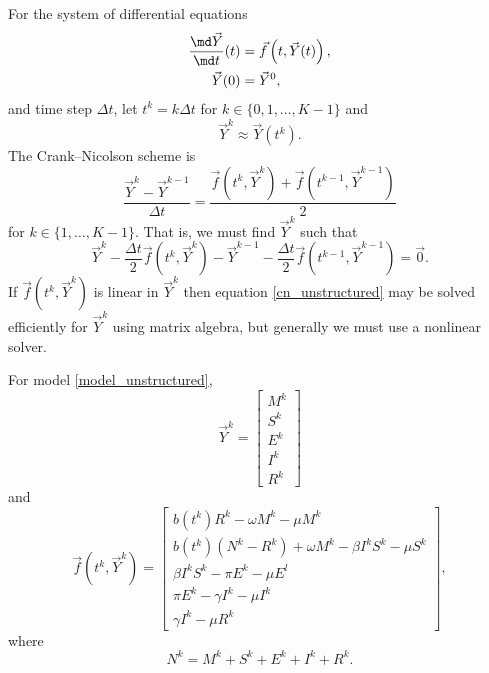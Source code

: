 \documentclass{jpmarticle}
\begin{document}
For the system of differential equations
\begin{equation}
  \begin{split}
    \frac{\md \vec{Y}}{\md t}(t)
    &= \vec{f}\left(t, \vec{Y}(t)\right),
    \\
    \vec{Y}(0) &= \vec{Y}^0,
  \end{split}
\end{equation}
and time step $\Delta t$, let $t^k = k \Delta t$ for
$k \in \{0, 1, \ldots, K - 1\}$ and
\begin{equation}
  \vec{Y}^k \approx \vec{Y}(t^k).
\end{equation}
The Crank--Nicolson scheme is
\begin{equation}
  \frac{\vec{Y}^k - \vec{Y}^{k - 1}}{\Delta t}
  = \frac{
    \vec{f}\left(t^k, \vec{Y}^k\right)
    + \vec{f}\left(t^{k - 1}, \vec{Y}^{k - 1}\right)
  }{2}
\end{equation}
for $k \in \{1, \ldots, K - 1\}$.
That is, we must find $\vec{Y}^k$ such that
\begin{equation}
  \label{cn_unstructured}
  \vec{Y}^k
  - \frac{\Delta t}{2}
  \vec{f}\left(t^k, \vec{Y}^k\right)
  - \vec{Y}^{k - 1}
  - \frac{\Delta t}{2}
  \vec{f}\left(t^{k - 1}, \vec{Y}^{k - 1}\right)
  = \vec{0}.
\end{equation}
If $\vec{f}\left(t^k, \vec{Y}^k\right)$ is linear in $\vec{Y}^k$
then equation \eqref{cn_unstructured} may be solved efficiently for
$\vec{Y}^k$ using matrix algebra, but generally we must use a
nonlinear solver.

For model \eqref{model_unstructured},
\begin{equation}
  \vec{Y}^k =
  \begin{bmatrix}
    M^k \\ S^k \\ E^k \\ I^k \\ R^k
  \end{bmatrix}
\end{equation}
and
\begin{equation}
  \vec{f}\left(t^k, \vec{Y}^k\right) =
  \begin{bmatrix}
    b\left(t^k\right) R^k
    - \omega M^k
    - \mu M^k
    \\
    b\left(t^k\right) \left(N^k - R^k\right)
    + \omega M^k
    - \beta I^k S^k
    - \mu S^k
    \\
    \beta I^k S^k
    - \pi E^k
    - \mu E^l
    \\
    \pi E^k
    - \gamma I^k
    - \mu I^k
    \\
    \gamma I^k
    - \mu R^k
  \end{bmatrix},
\end{equation}
where
\begin{equation}
  \label{eq:1}
  N^k = M^k + S^k + E^k + I^k + R^k.
\end{equation}
\end{document}
